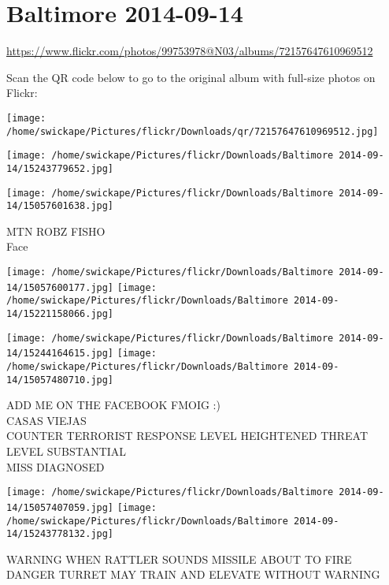 \documentclass[10pt,letterpaper]{article}
\title{}
\author{}
\date{}
\begin{document}
\section*{Baltimore 2014-09-14}

\url{https://www.flickr.com/photos/99753978@N03/albums/72157647610969512}

Scan the QR code below to go to the original album with full-size photos on Flickr:

\texttt{[image: /home/swickape/Pictures/flickr/Downloads/qr/72157647610969512.jpg]}
\pagebreak

\texttt{[image: /home/swickape/Pictures/flickr/Downloads/Baltimore 2014-09-14/15243779652.jpg]}

\vspace{0.25in}
\texttt{[image: /home/swickape/Pictures/flickr/Downloads/Baltimore 2014-09-14/15057601638.jpg]}

MTN ROBZ FISHO\\
Face
\pagebreak

\texttt{[image: /home/swickape/Pictures/flickr/Downloads/Baltimore 2014-09-14/15057600177.jpg]}
\texttt{[image: /home/swickape/Pictures/flickr/Downloads/Baltimore 2014-09-14/15221158066.jpg]}

\texttt{[image: /home/swickape/Pictures/flickr/Downloads/Baltimore 2014-09-14/15244164615.jpg]}
\texttt{[image: /home/swickape/Pictures/flickr/Downloads/Baltimore 2014-09-14/15057480710.jpg]}

ADD ME ON THE FACEBOOK FMOIG :)\\
CASAS VIEJAS\\
COUNTER TERRORIST RESPONSE LEVEL HEIGHTENED THREAT LEVEL SUBSTANTIAL\\
MISS DIAGNOSED
\pagebreak

\texttt{[image: /home/swickape/Pictures/flickr/Downloads/Baltimore 2014-09-14/15057407059.jpg]}
\texttt{[image: /home/swickape/Pictures/flickr/Downloads/Baltimore 2014-09-14/15243778132.jpg]}

WARNING WHEN RATTLER SOUNDS MISSILE ABOUT TO FIRE\\
DANGER TURRET MAY TRAIN AND ELEVATE WITHOUT WARNING
\pagebreak
\end{document}

